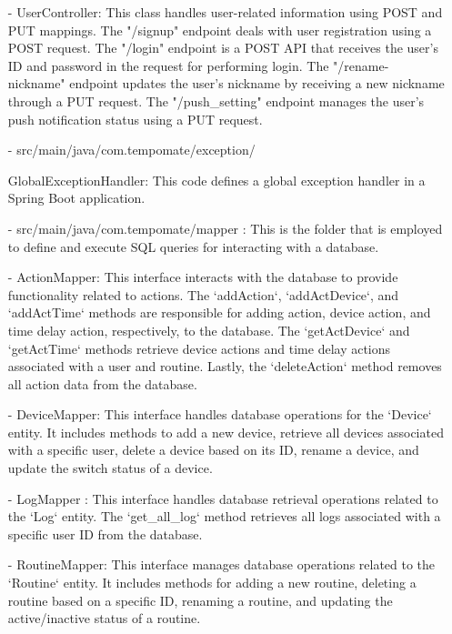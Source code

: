 \begin{enumerate}
                        \item[-] UserController: This class handles user-related information using POST and PUT mappings. The "/signup" endpoint deals with user registration using a POST request. The "/login" endpoint is a POST API that receives the user's ID and password in the request for performing login. The "/rename-nickname" endpoint updates the user's nickname by receiving a new nickname through a PUT request. The "/push\_setting" endpoint manages the user's push notification status using a PUT request.\\
                        \item[-] src/main/java/com.tempomate/exception/ \par GlobalExceptionHandler: This code defines a global exception handler in a Spring Boot application.\\
                        \item[-] src/main/java/com.tempomate/mapper : This is the folder that is employed to define and execute SQL queries for interacting with a database. \\
                        \item[-] ActionMapper: This interface interacts with the database to provide functionality related to actions. The `addAction`, `addActDevice`, and `addActTime` methods are responsible for adding action, device action, and time delay action, respectively, to the database. The `getActDevice` and `getActTime` methods retrieve device actions and time delay actions associated with a user and routine. Lastly, the `deleteAction` method removes all action data from the database. \\
                        \item[-] DeviceMapper: This interface handles database operations for the `Device` entity. It includes methods to add a new device, retrieve all devices associated with a specific user, delete a device based on its ID, rename a device, and update the switch status of a device. \\
                        \item[-] LogMapper : This interface handles database retrieval operations related to the `Log` entity. The `get\_all\_log` method retrieves all logs associated with a specific user ID from the database.\\
                        \item[-] RoutineMapper: This interface manages database operations related to the `Routine` entity. It includes methods for adding a new routine, deleting a routine based on a specific ID, renaming a routine, and updating the active/inactive status of a routine. \\

\end{enumerate}
